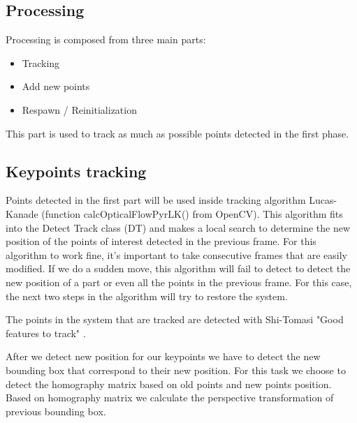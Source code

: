 \documentclass[runningheads,a4paper,11pt]{report}
\begin{document}
\subsection{Processing}
Processing is composed from three main parts: 
\begin{itemize}
    \item Tracking 
    \item Add new points 
    \item Respawn / Reinitialization
\end{itemize}
This part is used to track as much as possible points detected in the first phase.

\subsection{Keypoints tracking}
\par Points detected in the first part will be used inside tracking algorithm Lucas-Kanade \cite{Lucas:1981:IIR:1623264.1623280} (function calcOpticalFlowPyrLK() from OpenCV). This algorithm fits into the Detect Track  class (DT) and makes a local search to determine the new position of the points of interest detected in the previous frame. For this algorithm to work fine, it's important to take consecutive frames that are easily modified. If we do a sudden move, this algorithm will fail to detect to detect the new position of a part or even all the points in the previous frame. For this case, the next two steps in the algorithm will try to restore the system. 
\par The points in the system that are tracked are detected with Shi-Tomasi "Good features to track" \cite{323798}. 
\par After we detect new position for our keypoints we have to detect the new bounding box that correspond to their new position. For this task we choose to detect the homography matrix based on old points and new points position. Based on homography matrix we calculate the perspective transformation of previous bounding box.
\end{document}

